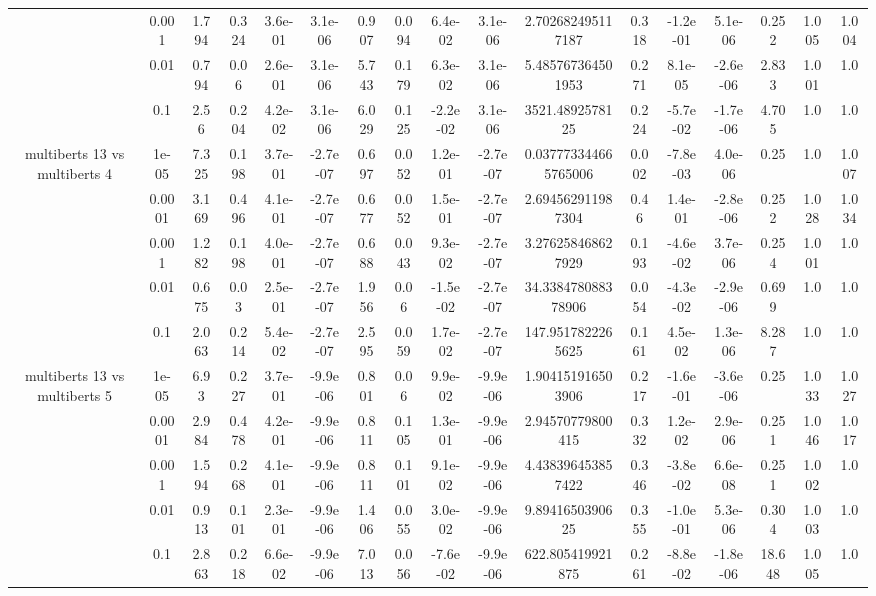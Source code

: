 \begin{tabular}{|c|c|c|c|c|c|c|c|c|c|c|c|c|c|c|c|c|}
 & 0.001 & 1.794 & 0.324 & 3.6e-01 & 3.1e-06 & 0.907 & 0.094 & 6.4e-02 & 3.1e-06 & 2.702682495117187 & 0.318 & -1.2e-01 & 5.1e-06 & 0.252 & 1.005 & 1.004 \\
 & 0.01 & 0.794 & 0.06 & 2.6e-01 & 3.1e-06 & 5.743 & 0.179 & 6.3e-02 & 3.1e-06 & 5.485767364501953 & 0.271 & 8.1e-05 & -2.6e-06 & 2.833 & 1.001 & 1.0 \\
 & 0.1 & 2.56 & 0.204 & 4.2e-02 & 3.1e-06 & 6.029 & 0.125 & -2.2e-02 & 3.1e-06 & 3521.4892578125 & 0.224 & -5.7e-02 & -1.7e-06 & 4.705 & 1.0 & 1.0 \\
\hline
\multirow{5}{*}{multiberts 13 vs multiberts 4} & 1e-05 & 7.325 & 0.198 & 3.7e-01 & -2.7e-07 & 0.697 & 0.052 & 1.2e-01 & -2.7e-07 & 0.037773344665765006 & 0.002 & -7.8e-03 & 4.0e-06 & 0.25 & 1.0 & 1.007 \\
 & 0.0001 & 3.169 & 0.496 & 4.1e-01 & -2.7e-07 & 0.677 & 0.052 & 1.5e-01 & -2.7e-07 & 2.694562911987304 & 0.46 & 1.4e-01 & -2.8e-06 & 0.252 & 1.028 & 1.034 \\
 & 0.001 & 1.282 & 0.198 & 4.0e-01 & -2.7e-07 & 0.688 & 0.043 & 9.3e-02 & -2.7e-07 & 3.276258468627929 & 0.193 & -4.6e-02 & 3.7e-06 & 0.254 & 1.001 & 1.0 \\
 & 0.01 & 0.675 & 0.03 & 2.5e-01 & -2.7e-07 & 1.956 & 0.06 & -1.5e-02 & -2.7e-07 & 34.338478088378906 & 0.054 & -4.3e-02 & -2.9e-06 & 0.699 & 1.0 & 1.0 \\
 & 0.1 & 2.063 & 0.214 & 5.4e-02 & -2.7e-07 & 2.595 & 0.059 & 1.7e-02 & -2.7e-07 & 147.9517822265625 & 0.161 & 4.5e-02 & 1.3e-06 & 8.287 & 1.0 & 1.0 \\
\hline
\multirow{5}{*}{multiberts 13 vs multiberts 5} & 1e-05 & 6.93 & 0.227 & 3.7e-01 & -9.9e-06 & 0.801 & 0.06 & 9.9e-02 & -9.9e-06 & 1.904151916503906 & 0.217 & -1.6e-01 & -3.6e-06 & 0.25 & 1.033 & 1.027 \\
 & 0.0001 & 2.984 & 0.478 & 4.2e-01 & -9.9e-06 & 0.811 & 0.105 & 1.3e-01 & -9.9e-06 & 2.94570779800415 & 0.332 & 1.2e-02 & 2.9e-06 & 0.251 & 1.046 & 1.017 \\
 & 0.001 & 1.594 & 0.268 & 4.1e-01 & -9.9e-06 & 0.811 & 0.101 & 9.1e-02 & -9.9e-06 & 4.438396453857422 & 0.346 & -3.8e-02 & 6.6e-08 & 0.251 & 1.002 & 1.0 \\
 & 0.01 & 0.913 & 0.101 & 2.3e-01 & -9.9e-06 & 1.406 & 0.055 & 3.0e-02 & -9.9e-06 & 9.8941650390625 & 0.355 & -1.0e-01 & 5.3e-06 & 0.304 & 1.003 & 1.0 \\
 & 0.1 & 2.863 & 0.218 & 6.6e-02 & -9.9e-06 & 7.013 & 0.056 & -7.6e-02 & -9.9e-06 & 622.805419921875 & 0.261 & -8.8e-02 & -1.8e-06 & 18.648 & 1.005 & 1.0 \\

\end{tabular}
